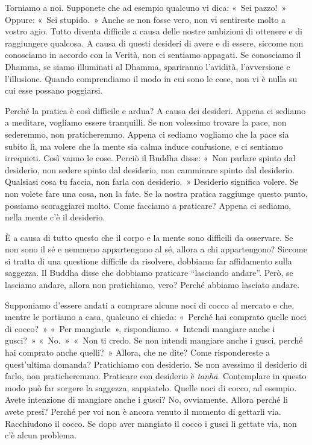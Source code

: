 Torniamo a noi. Supponete che ad esempio qualcuno vi dica: «~Sei
pazzo!~» Oppure: «~Sei stupido.~» Anche se non fosse vero, non vi
sentireste molto a vostro agio. Tutto diventa difficile a causa delle
nostre ambizioni di ottenere e di raggiungere qualcosa. A causa di
questi desideri di avere e di essere, siccome non conosciamo in accordo
con la Verità, non ci sentiamo appagati. Se conosciamo il Dhamma, se
siamo illuminati al Dhamma, spariranno l'avidità, l'avversione e
l'illusione. Quando comprendiamo il modo in cui sono le cose, non vi è
nulla su cui esse possano poggiarsi.

Perché la pratica è così difficile e ardua? A causa dei desideri. Appena
ci sediamo a meditare, vogliamo essere tranquilli. Se non volessimo
trovare la pace, non sederemmo, non praticheremmo. Appena ci sediamo
vogliamo che la pace sia subito lì, ma volere che la mente sia calma
induce confusione, e ci sentiamo irrequieti. Così vanno le cose. Perciò
il Buddha disse: «~Non parlare spinto dal desiderio, non sedere spinto
dal desiderio, non camminare spinto dal desiderio. Qualsiasi cosa tu
faccia, non farla con desiderio.~» Desiderio significa volere. Se non
volete fare una cosa, non la fate. Se la nostra pratica raggiunge questo
punto, possiamo scoraggiarci molto. Come facciamo a praticare? Appena ci
sediamo, nella mente c'è il desiderio.

È a causa di tutto questo che il corpo e la mente sono difficili da
osservare. Se non sono il sé e nemmeno appartengono al sé, allora a chi
appartengono? Siccome si tratta di una questione difficile da risolvere,
dobbiamo far affidamento sulla saggezza. Il Buddha disse che dobbiamo
praticare ``lasciando andare''. Però, se lasciamo andare, allora non
pratichiamo, vero? Perché abbiamo lasciato andare.

Supponiamo d'essere andati a comprare alcune noci di cocco al mercato e
che, mentre le portiamo a casa, qualcuno ci chieda: «~Perché hai
comprato quelle noci di cocco?~» «~Per mangiarle~», rispondiamo.
«~Intendi mangiare anche i gusci?~» «~No.~»~«~Non ti credo. Se non
intendi mangiare anche i gusci, perché hai comprato anche quelli?~»
Allora, che ne dite? Come rispondereste a quest'ultima domanda?
Pratichiamo con desiderio. Se non avessimo il desiderio di farlo, non
praticheremmo. Praticare con desiderio è \emph{taṇhā}. Contemplare in
questo modo può far sorgere la saggezza, sappiatelo. Quelle noci di
cocco, ad esempio. Avete intenzione di mangiare anche i gusci? No,
ovviamente. Allora perché li avete presi? Perché per voi non è ancora
venuto il momento di gettarli via. Racchiudono il cocco. Se dopo aver
mangiato il cocco i gusci li gettate via, non c'è alcun problema.

